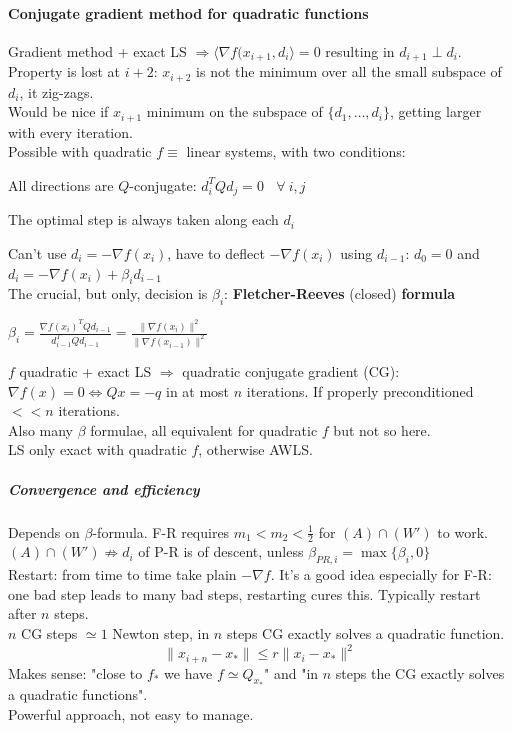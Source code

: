 \documentclass[10pt]{report}
\begin{document}
\paragraph{Conjugate gradient method for quadratic functions} Gradient method + exact LS $\Rightarrow \langle \nabla f(x_{i+1}, d_i\rangle = 0$ resulting in $d_{i+1} \perp d_i$. Property is lost at $i+2$: $x_{i+2}$ is not the minimum over all the small subspace of $d_i$, it zig-zags.\\
Would be nice if $x_{i+1}$ minimum on the subspace of $\{d_1,\ldots,d_i\}$, getting larger with every iteration.\\
Possible with quadratic $f\equiv$ linear systems, with two conditions:
\begin{list}{}{}
	\item All directions are $Q$-conjugate: $d_i^TQd_j=0\:\:\:\:\forall\:i,j$
	\item The optimal step is always taken along each $d_i$
\end{list}
Can't use $d_i = -\nabla f(x_i)$, have to deflect $-\nabla f(x_i)$ using $d_{i-1}$: $d_0 = 0$ and $d_i = -\nabla f(x_i) + \beta_id_{i-1}$\\
The crucial, but only, decision is $\beta_i$: \textbf{Fletcher-Reeves} (closed) \textbf{formula}
\begin{list}{}{}
	\item $\beta_i = \frac{\displaystyle \nabla f(x_i)^T Qd_{i-1}}{\displaystyle d_{i-1}^TQd_{i-1}} = \frac{\displaystyle \|\nabla f(x_i)\|^2}{\displaystyle \|\nabla f(x_{i-1})\|^2}$
\end{list}
$f$ quadratic + exact LS $\Rightarrow$ quadratic conjugate gradient (CG): $\nabla f(x) = 0 \Leftrightarrow Qx = -q$ in at most $n$ iterations. If properly preconditioned $<< n$ iterations.\\
Also many $\beta$ formulae, all equivalent for quadratic $f$ but not so here.\\
LS only exact with quadratic $f$, otherwise AWLS.
\subparagraph{Convergence and efficiency} Depends on $\beta$-formula. F-R requires $m_1<m_2<\frac{1}{2}$ for $(A)\cap(W')$ to work.\\
$(A)\cap(W')\not\Rightarrow d_i$ of P-R is of descent, unless $\beta_{PR,i} = \max\{\beta_i, 0\}$\\
Restart: from time to time take plain $-\nabla f$. It's a good idea especially for F-R: one bad step leads to many bad steps, restarting cures this. Typically restart after $n$ steps.\\
$n$ CG steps $\simeq 1$ Newton step, in $n$ steps CG exactly solves a quadratic function.
$$\|x_{i+n}-x_*\|\leq r\|x_i-x_*\|^2$$
Makes sense: "close to $f_*$ we have $f\simeq Q_{x_*}$" and "in $n$ steps the CG exactly solves a quadratic functions".\\
Powerful approach, not easy to manage.
\end{document}
